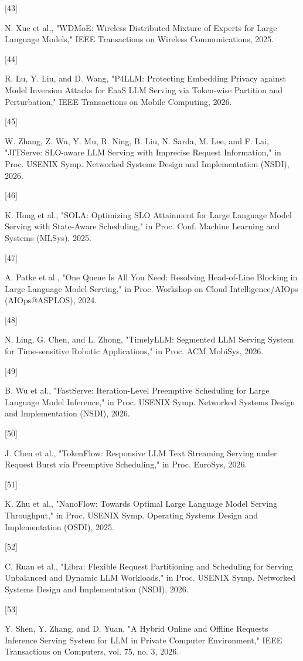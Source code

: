 \hypertarget{ref:43}{[43]} N. Xue et al., "WDMoE: Wireless Distributed Mixture of Experts for Large Language Models," IEEE Transactions on Wireless Communications, 2025.

\hypertarget{ref:44}{[44]} R. Lu, Y. Liu, and D. Wang, "P4LLM: Protecting Embedding Privacy against Model Inversion Attacks for EaaS LLM Serving via Token-wise Partition and Perturbation," IEEE Transactions on Mobile Computing, 2026.

\hypertarget{ref:45}{[45]} W. Zhang, Z. Wu, Y. Mu, R. Ning, B. Liu, N. Sarda, M. Lee, and F. Lai, "JITServe: SLO-aware LLM Serving with Imprecise Request Information," in Proc. USENIX Symp. Networked Systems Design and Implementation (NSDI), 2026.

\hypertarget{ref:46}{[46]} K. Hong et al., "SOLA: Optimizing SLO Attainment for Large Language Model Serving with State-Aware Scheduling," in Proc. Conf. Machine Learning and Systems (MLSys), 2025.

\hypertarget{ref:47}{[47]} A. Patke et al., "One Queue Is All You Need: Resolving Head-of-Line Blocking in Large Language Model Serving," in Proc. Workshop on Cloud Intelligence/AIOps (AIOps@ASPLOS), 2024.

\hypertarget{ref:48}{[48]} N. Ling, G. Chen, and L. Zhong, "TimelyLLM: Segmented LLM Serving System for Time-sensitive Robotic Applications," in Proc. ACM MobiSys, 2026.

\hypertarget{ref:49}{[49]} B. Wu et al., "FastServe: Iteration-Level Preemptive Scheduling for Large Language Model Inference," in Proc. USENIX Symp. Networked Systems Design and Implementation (NSDI), 2026.

\hypertarget{ref:50}{[50]} J. Chen et al., "TokenFlow: Responsive LLM Text Streaming Serving under Request Burst via Preemptive Scheduling," in Proc. EuroSys, 2026.

\hypertarget{ref:51}{[51]} K. Zhu et al., "NanoFlow: Towards Optimal Large Language Model Serving Throughput," in Proc. USENIX Symp. Operating Systems Design and Implementation (OSDI), 2025.

\hypertarget{ref:52}{[52]} C. Ruan et al., "Libra: Flexible Request Partitioning and Scheduling for Serving Unbalanced and Dynamic LLM Workloads," in Proc. USENIX Symp. Networked Systems Design and Implementation (NSDI), 2026.

\hypertarget{ref:53}{[53]} Y. Shen, Y. Zhang, and D. Yuan, "A Hybrid Online and Offline Requests Inference Serving System for LLM in Private Computer Environment," IEEE Transactions on Computers, vol. 75, no. 3, 2026.

